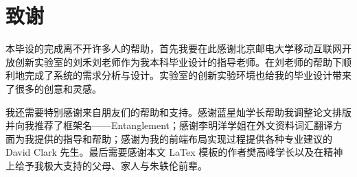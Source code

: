 \chapter*{致\qquad 谢}
\songti{}

本毕设的完成离不开许多人的帮助，首先我要在此感谢北京邮电大学移动互联网开放创新实验室的刘禾刘老师作为我本科毕业设计的指导老师。在刘老师的帮助下顺利地完成了系统的需求分析与设计。实验室的创新实验环境也给我的毕业设计带来了很多的创意和灵感。

我还需要特别感谢来自朋友们的帮助和支持。感谢蓝星灿学长帮助我调整论文排版并向我推荐了框架名——Entanglement；感谢李明洋学姐在外文资料词汇翻译方面为我提供的指导和帮助；感谢为我的前端布局实现过程提供各种专业建议的 David Clark 先生。最后需要感谢本文 LaTex 模板的作者樊高峰学长以及在精神上给予我极大支持的父母、家人与朱轶伦前辈。

